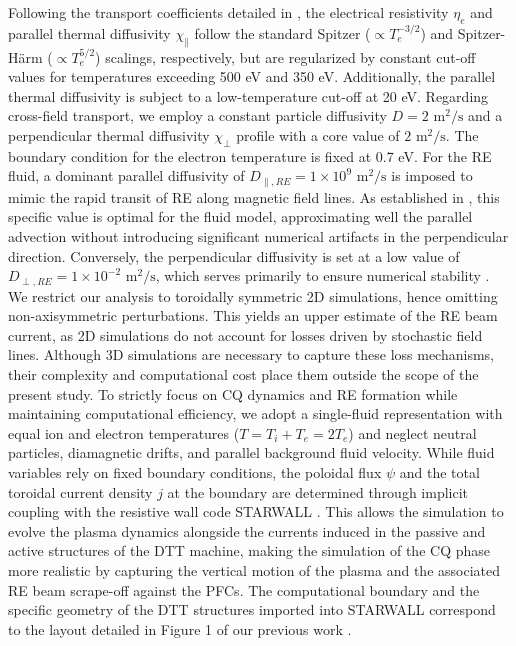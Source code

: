 \documentclass[aip,reprint]{revtex4-1}
\begin{document}
Following the transport coefficients detailed in \cite{Emanuelli2025}, the electrical resistivity $\eta_e$ and parallel thermal diffusivity $\chi_{\parallel}$ follow the standard Spitzer ($\propto T_e^{-3/2}$) and Spitzer-Härm ($\propto T_e^{5/2}$) scalings, respectively, but are regularized by constant cut-off values for temperatures exceeding 500 eV and 350 eV. Additionally, the parallel thermal diffusivity is subject to a low-temperature cut-off at 20 eV. Regarding cross-field transport, we employ a constant particle diffusivity $D = 2$ $\text{m}^2/\text{s}$ and a perpendicular thermal diffusivity $\chi_{\perp}$ profile with a core value of $2$ $\text{m}^2/\text{s}$. The boundary condition for the electron temperature is fixed at 0.7 eV. For the RE fluid, a dominant parallel diffusivity of $D_{\parallel, RE} = 1 \times 10^9$ $\text{m}^2/\text{s}$ is imposed to mimic the rapid transit of RE along magnetic field lines. As established in \cite{Bandaru2024a}, this specific value is optimal for the fluid model, approximating well the parallel advection without introducing significant numerical artifacts in the perpendicular direction. Conversely, the perpendicular diffusivity is set at a low value of $D_{\perp, RE} = 1 \times 10^{-2}$ $\text{m}^2/\text{s}$, which serves primarily to ensure numerical stability \cite{Bandaru2024b}. We restrict our analysis to toroidally symmetric 2D simulations, hence omitting non-axisymmetric perturbations. This yields an upper estimate of the RE beam current, as 2D simulations do not account for losses driven by stochastic field lines. Although 3D simulations are necessary to capture these loss mechanisms, their complexity and computational cost place them outside the scope of the present study. To strictly focus on CQ dynamics and RE formation while maintaining computational efficiency, we adopt a single-fluid representation with equal ion and electron temperatures ($T = T_i + T_e = 2T_e$) and neglect neutral particles, diamagnetic drifts, and parallel background fluid velocity.
While fluid variables rely on fixed boundary conditions, the poloidal flux $\psi$ and the total toroidal current density $j$ at the boundary are determined through implicit coupling with the resistive wall code STARWALL \cite{Hoelzl2012}. This allows the simulation to evolve the plasma dynamics alongside the currents induced in the passive and active structures of the DTT machine, making the simulation of the CQ phase more realistic by capturing the vertical motion of the plasma and the associated RE beam scrape-off against the PFCs. The computational boundary and the specific geometry of the DTT structures imported into STARWALL correspond to the layout detailed in Figure 1 of our previous work \cite{Emanuelli2025}.
\end{document}

